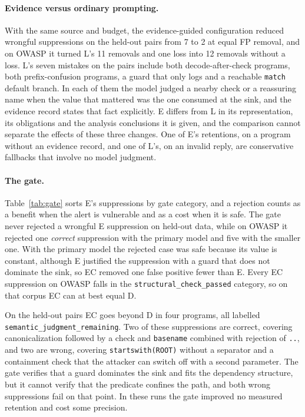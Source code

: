 \paragraph{Evidence versus ordinary prompting.}
With the same source and budget, the evidence-guided configuration reduced wrongful suppressions on the held-out pairs from 7 to 2 at equal FP removal, and on OWASP it turned L's 11 removals and one loss into 12 removals without a loss. L's seven mistakes on the pairs include both decode-after-check programs, both prefix-confusion programs, a guard that only logs and a reachable \texttt{match} default branch. In each of them the model judged a nearby check or a reassuring name when the value that mattered was the one consumed at the sink, and the evidence record states that fact explicitly. E differs from L in its representation, its obligations and the analysis conclusions it is given, and the comparison cannot separate the effects of these three changes. One of E's retentions, on a program without an evidence record, and one of L's, on an invalid reply, are conservative fallbacks that involve no model judgment.

\paragraph{The gate.}
Table~\ref{tab:gate} sorts E's suppressions by gate category, and a rejection counts as a benefit when the alert is vulnerable and as a cost when it is safe. The gate never rejected a wrongful E suppression on held-out data, while on OWASP it rejected one \emph{correct} suppression with the primary model and five with the smaller one. With the primary model the rejected case was safe because its value is constant, although E justified the suppression with a guard that does not dominate the sink, so EC removed one false positive fewer than E. Every EC suppression on OWASP falls in the \texttt{structural\_check\_passed} category, so on that corpus EC can at best equal D.

On the held-out pairs EC goes beyond D in four programs, all labelled \texttt{semantic\_judgment\_remaining}. Two of these suppressions are correct, covering canonicalization followed by a check and \texttt{basename} combined with rejection of \texttt{..}, and two are wrong, covering \texttt{startswith(ROOT)} without a separator and a containment check that the attacker can switch off with a second parameter. The gate verifies that a guard dominates the sink and fits the dependency structure, but it cannot verify that the predicate confines the path, and both wrong suppressions fail on that point. In these runs the gate improved no measured retention and cost some precision.

